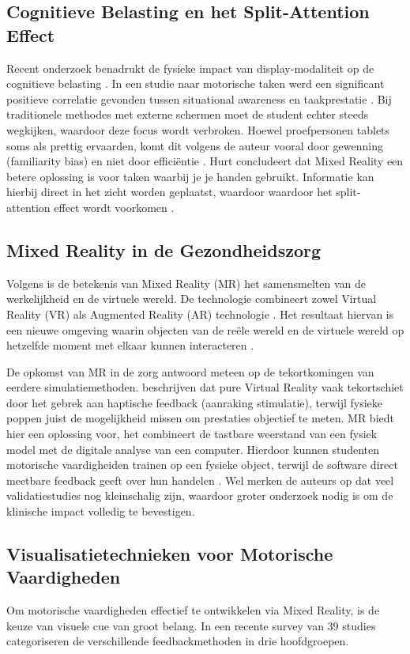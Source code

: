 \subsection{Cognitieve Belasting en het Split-Attention Effect}
Recent onderzoek benadrukt de fysieke impact van display-modaliteit op de cognitieve belasting \autocite{Hurt2024}. In een studie naar motorische taken werd een significant
positieve correlatie gevonden tussen situational awareness en taakprestatie \autocite{Hurt2024}. Bij traditionele methodes met externe schermen moet de student echter steeds
wegkijken, waardoor deze focus wordt verbroken. 
Hoewel proefpersonen tablets soms als prettig ervaarden, komt dit volgens de auteur vooral door gewenning (familiarity bias) en niet door efficiëntie \autocite{Hurt2024}.
Hurt concludeert dat Mixed Reality een betere oplossing is voor taken waarbij je je handen gebruikt. Informatie kan hierbij direct in het zicht worden geplaatst,
waardoor waardoor het split-attention effect wordt voorkomen \autocite{Hurt2024}.

\subsection{Mixed Reality in de Gezondheidszorg}
Volgens \textcite{Gerup2020} is de betekenis van Mixed Reality (MR) het samensmelten van de werkelijkheid en de virtuele wereld. De technologie
combineert zowel Virtual Reality (VR) als Augmented Reality (AR) technologie \autocite{Gerup2020}. 
Het resultaat hiervan is een nieuwe omgeving waarin objecten van
de reële wereld en de virtuele wereld op hetzelfde moment met elkaar kunnen interacteren \autocite{Carroll2020}.

De opkomst van MR in de zorg antwoord meteen op de tekortkomingen van eerdere simulatiemethoden. \textcite{DAngelo2021} beschrijven dat pure Virtual Reality vaak
tekortschiet door het gebrek aan haptische feedback (aanraking stimulatie), terwijl fysieke poppen juist de mogelijkheid missen om prestaties objectief te meten. 
MR biedt hier een oplossing voor, het combineert de tastbare weerstand van een fysiek model met de digitale analyse van een computer. Hierdoor kunnen studenten 
motorische vaardigheiden trainen op een fysieke object, terwijl de software direct meetbare feedback geeft over hun handelen \autocite{DAngelo2021}.
Wel merken de auteurs op dat veel validatiestudies nog kleinschalig zijn, waardoor groter onderzoek nodig is om de klinische impact volledig te bevestigen.

\subsection{Visualisatietechnieken voor Motorische Vaardigheden}
Om motorische vaardigheden effectief te ontwikkelen via Mixed Reality, is de keuze van visuele cue van groot belang. In een recente survey van 39 studies categoriseren 
\textcite{Diller2024} de verschillende feedbackmethoden in drie hoofdgroepen.

